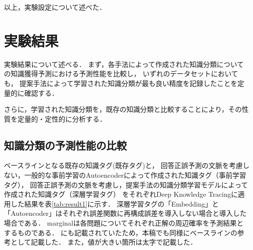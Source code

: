以上，実験設定について述べた．



\section{実験結果}
実験結果について述べる．
まず，各手法によって作成された知識分類についての知識獲得予測における予測性能を比較し，
いずれのデータセットにおいても，
提案手法によって学習された知識分類が最も良い精度を記録したことを定量的に確認する．

さらに，学習された知識分類を，既存の知識分類と比較することにより，その性質を定量的・定性的に分析する．



\subsection{知識分類の予測性能の比較}

\begin{table}[!htb]
\caption{各知識タグの知識獲得予測における予測性能}
\label{tab:result1}
\begin{center}
\end{center}
\end{table}


ベースラインとなる既存の知識タグ(既存タグ)と，
回答正誤予測の文脈を考慮しない，一般的な事前学習のAutoencoderによって作成された知識タグ（事前学習タグ），
回答正誤予測の文脈を考慮し，提案手法の知識分類学習モデルによって作成された知識タグ（深層学習タグ）
をそれぞれDeep Knowledge Tracingに適用した結果を表\ref{tab:result1}に示す．
深層学習タグの「Embedding」と「Autoencoder」はそれぞれ誤差関数に再構成誤差を導入しない場合と導入した場合である．
marginalは各問題についてそれぞれ正解の周辺確率を予測結果とするものである．
\cite{piech2015deep}にも記載されていたため，本稿でも同様にベースラインの参考として記載した．
また，値が大きい箇所は太字で記載した．

